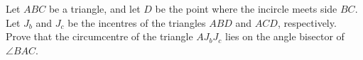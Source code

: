 Let $ABC$ be a triangle, and let $D$ be the point where the incircle meets side $BC$. Let $J_b$ and $J_c$ be the incentres of the triangles $ABD$ and $ACD$, respectively. Prove that the circumcentre of the triangle $AJ_bJ_c$ lies on the angle bisector of $\angle BAC$.